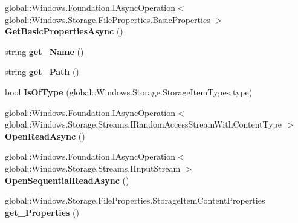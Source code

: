 \begin{DoxyCompactItemize}
\mbox{\label{class_windows_1_1_storage_1_1_storage_file_acf51ed8048b0f4497f173a6c8addf43f}} 
global\+::\+Windows.\+Foundation.\+I\+Async\+Operation$<$ global\+::\+Windows.\+Storage.\+File\+Properties.\+Basic\+Properties $>$ {\bfseries Get\+Basic\+Properties\+Async} ()
\item 
\mbox{\label{class_windows_1_1_storage_1_1_storage_file_a7a2ef38514c8d6dc439918de9aa6feb7}} 
string {\bfseries get\+\_\+\+Name} ()
\item 
\mbox{\label{class_windows_1_1_storage_1_1_storage_file_ad961bebed52f4f6b04a97201c511e841}} 
string {\bfseries get\+\_\+\+Path} ()
\item 
\mbox{\label{class_windows_1_1_storage_1_1_storage_file_aab7da0a2a5ea0ef0219616c0ebbf92e7}} 
bool {\bfseries Is\+Of\+Type} (global\+::\+Windows.\+Storage.\+Storage\+Item\+Types type)
\item 
\mbox{\label{class_windows_1_1_storage_1_1_storage_file_a35c626039408667e2520e113fb58342d}} 
global\+::\+Windows.\+Foundation.\+I\+Async\+Operation$<$ global\+::\+Windows.\+Storage.\+Streams.\+I\+Random\+Access\+Stream\+With\+Content\+Type $>$ {\bfseries Open\+Read\+Async} ()
\item 
\mbox{\label{class_windows_1_1_storage_1_1_storage_file_adc6fa1909202e33273e037fa3347c319}} 
global\+::\+Windows.\+Foundation.\+I\+Async\+Operation$<$ global\+::\+Windows.\+Storage.\+Streams.\+I\+Input\+Stream $>$ {\bfseries Open\+Sequential\+Read\+Async} ()
\item 
\mbox{\label{class_windows_1_1_storage_1_1_storage_file_a9a59e8a2f5bd44c25773662197b786bd}} 
global\+::\+Windows.\+Storage.\+File\+Properties.\+Storage\+Item\+Content\+Properties {\bfseries get\+\_\+\+Properties} ()
\item 
\mbox{\label{class_windows_1_1_storage_1_1_storage_file_a5c85dbe0011a81cc6ef4b8d88c05567e}} 

\end{DoxyCompactItemize}
